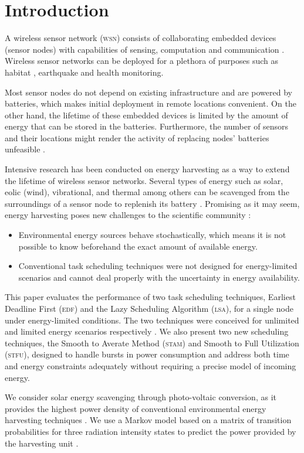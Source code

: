 \section{Introduction}\label{sec:introduction}

A wireless sensor network (\textsc{wsn}) consists of collaborating embedded devices (sensor nodes) with capabilities of sensing, computation and communication
\cite{sudevalyam2010energy}. Wireless sensor networks can be deployed for a plethora of purposes such as habitat \cite{mainwaring2002wireless},
earthquake \cite{suzuki2007earthquake} and health \cite{saadaoui2007architecture} monitoring.

Most sensor nodes do not depend on existing infrastructure and are powered by batteries, which makes initial deployment in remote locations
convenient. On the other hand, the lifetime of these embedded devices is limited by the amount of energy that can be stored in the batteries. Furthermore, 
the number of sensors and their locations might render the activity of replacing nodes' batteries unfeasible \cite{moser2007real}. 

Intensive research has been conducted on energy harvesting as a way to extend the lifetime of wireless sensor networks. Several types of energy such as
solar, eolic (wind), vibrational, and thermal among others can be scavenged from the surroundings of a sensor node to replenish its battery \cite{roundy2004power}. 
Promising as it may seem, energy harvesting poses new challenges to the scientific community \cite{lu2010accurate}:

\begin{itemize}
	\item Environmental energy sources behave stochastically, which means it is not possible to know beforehand the exact amount of available energy.
	\item Conventional task scheduling techniques were not designed for energy-limited scenarios and cannot deal properly with the uncertainty in energy availability.
\end{itemize}

This paper evaluates the performance of two task scheduling techniques, Earliest Deadline First (\textsc{edf}) and the Lazy Scheduling
Algorithm (\textsc{lsa}), for a single node under energy-limited conditions. The two techniques were conceived for unlimited and limited energy scenarios respectively \cite{moser2007real}. We also present two new scheduling techniques, the Smooth to Averate Method
(\textsc{stam}) and Smooth to Full Utilization (\textsc{stfu}), designed to handle bursts in power consumption and address both time and energy constraints adequately without requiring a precise model of incoming energy.

We consider solar energy scavenging through photo-voltaic conversion, as it provides the highest power density of conventional environmental energy harvesting techniques
\cite{raghunathan2005design}. We use a Markov model based on a matrix of transition probabilities for three radiation intensity states to predict
the power provided by the harvesting unit \cite{poggi2000stochastic}.